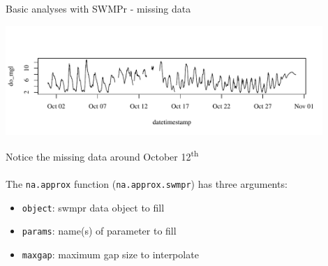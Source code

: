 \documentclass[xcolor=dvipsnames]{beamer}\usepackage[]{graphicx}\usepackage[]{color}
\newenvironment{knitrout}{}{} %
\begin{document}
\begin{frame}[fragile]{Basic analyses with SWMPr - missing data}
\begin{knitrout}\scriptsize
{}\color{fgcolor}

{\centering \includegraphics[width=0.9\textwidth]{figure/unnamed-chunk-6-1} 

}



\end{knitrout}
Notice the missing data around October 12\textsuperscript{th} \\~\\
The \texttt{na.approx} function (\texttt{na.approx.swmpr}) has three arguments:
\begin{itemize}
\item \texttt{object}: swmpr data object to fill
\item \texttt{params}: name(s) of parameter to fill
\item \texttt{maxgap}: maximum gap size to interpolate
\end{itemize}
\end{frame}
\end{document}
